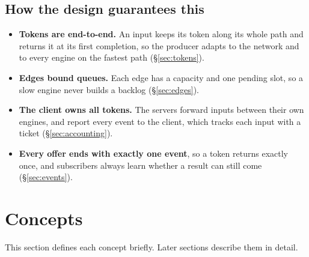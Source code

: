 \documentclass[11pt]{article}
\begin{document}
\subsection{How the design guarantees this}

\begin{itemize}[nosep]
  \item \textbf{Tokens are end-to-end.} An input keeps its token along its
        whole path and returns it at its first completion, so the producer
        adapts to the network and to every engine on the fastest path
        (\S\ref{sec:tokens}).
  \item \textbf{Edges bound queues.} Each edge has a capacity and one pending
        slot, so a slow engine never builds a backlog (\S\ref{sec:edges}).
  \item \textbf{The client owns all tokens.} The servers forward inputs between
        their own engines, and report every event to the client, which tracks
        each input with a ticket (\S\ref{sec:accounting}).
  \item \textbf{Every offer ends with exactly one event}, so a token returns
        exactly once, and subscribers always learn whether a result can still
        come (\S\ref{sec:events}).
\end{itemize}

\section{Concepts}
\label{sec:concepts}

This section defines each concept briefly. Later sections describe them in
detail.
\end{document}
